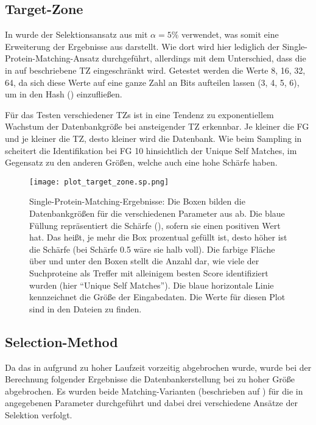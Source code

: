     \subsection{Target-Zone} %
        \label{sub:target_results}
        In  wurde der Selektionsansatz aus  mit $\alpha=5\%$ verwendet, was somit eine Erweiterung der Ergebnisse aus  darstellt. Wie dort wird hier lediglich der Single-Protein-Matching-Ansatz durchgeführt, allerdings mit dem Unterschied, dass die in  auf  beschriebene \acl{TZ} eingeschränkt wird. Getestet werden die Werte 8, 16, 32, 64, da sich diese Werte auf eine ganze Zahl an Bits aufteilen lassen (3, 4, 5, 6), um in den Hash () einzufließen.

        Für das Testen verschiedener \acp{TZ} ist in  eine Tendenz zu exponentiellem Wachstum der Datenbankgröße bei ansteigender \ac{TZ} erkennbar. Je kleiner die \acl{FG} und je kleiner die \ac{TZ}, desto kleiner wird die Datenbank. Wie beim Sampling in  scheitert die Identifikation bei \ac{FG} 10 hinsichtlich der Unique Self Matches, im Gegensatz zu den anderen Größen, welche auch eine hohe Schärfe haben.

        \begin{figure}[H]
            \centering
            \texttt{[image: plot\_target\_zone.sp.png]}
            \caption[Single-Protein-Matching ]{Single-Protein-Matching-Ergebnisse: Die Boxen bilden die Datenbankgrößen für die verschiedenen Parameter aus  ab. Die blaue Füllung repräsentiert die Schärfe (), sofern sie einen positiven Wert hat. Das heißt, je mehr die Box prozentual gefüllt ist, desto höher ist die Schärfe (bei Schärfe 0.5 wäre sie halb voll). Die farbige Fläche über und unter den Boxen stellt die Anzahl dar, wie viele der Suchproteine als Treffer mit alleinigem besten Score identifiziert wurden (hier ``Unique Self Matches''). Die blaue horizontale Linie kennzeichnet die Größe der Eingabedaten. Die Werte für diesen Plot sind in den Dateien  zu finden.}
            \label{fig:target_zone.sp}
        \end{figure}

    \subsection{Selection-Method} %
        \label{sub:selection_results}
        Da das  in  aufgrund zu hoher Laufzeit vorzeitig abgebrochen wurde, wurde bei der Berechnung folgender Ergebnisse die Datenbankerstellung bei zu hoher Größe abgebrochen. Es wurden beide Matching-Varianten (beschrieben auf ) für die in  angegebenen Parameter durchgeführt und dabei drei verschiedene Ansätze der Selektion verfolgt.

